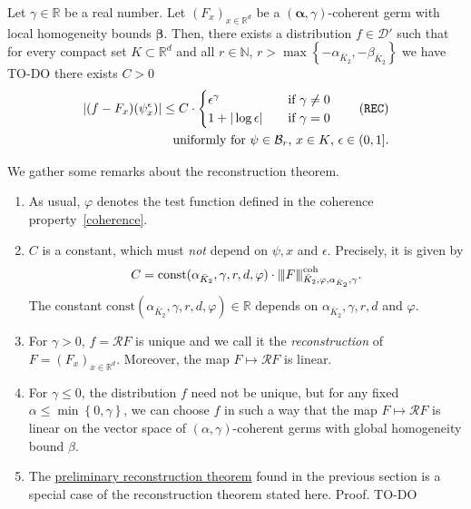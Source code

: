 \begin{theorem}\label{theorem:reconstruction-theorem}
   Let \(\gamma \in \mathbb{R}\) be a real number. Let \({(F_x)}_{x \in \mathbb{R}^d}\) be a \((\bm{\alpha}, \gamma)\)-coherent germ with local homogeneity bounds \(\bm \beta\). Then, there exists a distribution \(f \in \mathcal{D}'\) such that for every compact set \(K \subset \mathbb{R}^d\) and all \(r \in \mathbb{N}\), \(r> \max \left\{ -\alpha_{\bar K_2}, -\beta_{\bar K_2} \right\}\) we have TO-DO there exists \(C > 0\) 
   \begin{align*}\label{reconstruction-theorem}
        |(f-F_x)(\psi^\epsilon_x)| \leq C \cdot \begin{cases}
            \epsilon^\gamma \quad & \text{if \(\gamma \neq 0\)}\\
            1 + |\log \epsilon| \quad & \text{if \(\gamma = 0\)}
        \end{cases}\tag{\texttt{REC}}
        \\ \text{uniformly for \(\psi \in \mathcal{B}_r\), \(x \in K\), \(\epsilon \in (0,1]\).} 
   \end{align*}
\end{theorem}

\begin{remark} 
   We gather some remarks about the reconstruction theorem.
\begin{enumerate}
   \item As usual, \(\varphi\) denotes the test function defined in the coherence property~\eqref{coherence}.
   \item \(C\) is a constant, which must \emph{not} depend on \(\psi,x\) and \(\epsilon\). Precisely, it is given by \begin{align*}
           C = \mathrm{const}(\alpha_{\bar K_2}, \gamma, r, d, \varphi) \cdot {\left\vert\kern-0.25ex\left\vert\kern-0.25ex\left\vert F \right\vert\kern-0.25ex\right\vert\kern-0.25ex\right\vert}^{\mathrm{coh}}_{\bar K_2, \varphi, \alpha_{\bar K_2}, \gamma}.
   \end{align*}
   The constant \(\mathrm{const}(\alpha_{\bar K_2}, \gamma, r, d, \varphi) \in \mathbb{R}\) depends on \(\alpha_{\bar K_2}, \gamma, r, d\) and \(\varphi\).
   \item For \(\gamma > 0\), \(f = \mathcal{R}F\) is unique and we call it the \emph{reconstruction} of \(F = {(F_x)}_{x \in \mathbb{R}^d}\). Moreover, the map \(F \mapsto \mathcal{R}F\) is linear.
   \item For \(\gamma \leq 0\), the distribution \(f\) need not be unique, but for any fixed \(\alpha \leq \min\left\{ 0, \gamma \right\}\), we can choose \(f\) in such a way that the map \(F \mapsto \mathcal{R}F\) is linear on the vector space of \((\alpha,\gamma)\)-coherent germs with global homogeneity bound \(\beta\).
   \item The \hyperref[peek:prelim-reconstruction-theorem]{preliminary reconstruction theorem} found in the previous section is a special case of the reconstruction theorem stated here. Proof. TO-DO
\end{enumerate}
\end{remark}

